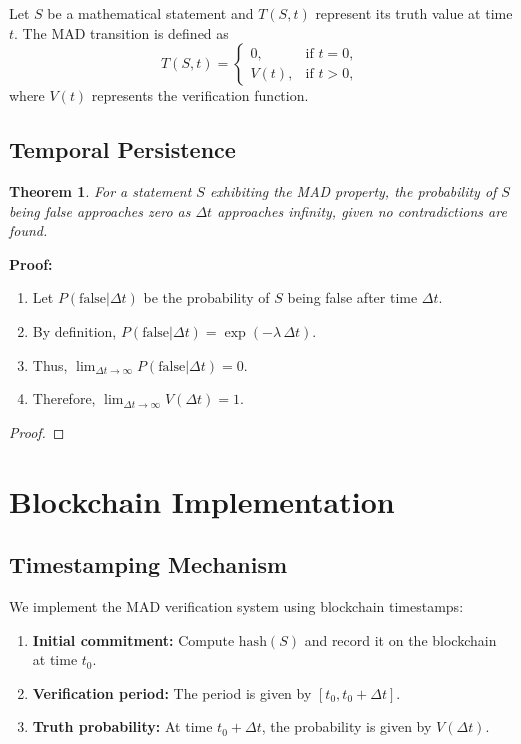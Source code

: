 \documentclass[11pt]{article}
\newtheorem{theorem}{Theorem}[section]
\begin{document}
Let $S$ be a mathematical statement and $T(S,t)$ represent its truth value at time $t$. The MAD transition is defined as
\[
T(S,t) = \begin{cases}
0, & \text{if } t = 0, \\
V(t), & \text{if } t > 0,
\end{cases}
\]
where $V(t)$ represents the verification function.

\subsection{Temporal Persistence}

\begin{theorem}
For a statement $S$ exhibiting the MAD property, the probability of $S$ being false approaches zero as $\Delta t$ approaches infinity, given no contradictions are found.
\end{theorem}

\noindent\textbf{Proof:} 
\begin{enumerate}[label=(\roman*)]
    \item Let $P(\text{false}|\Delta t)$ be the probability of $S$ being false after time $\Delta t$.
    \item By definition, $P(\text{false}|\Delta t)=\exp(-\lambda\,\Delta t)$.
    \item Thus, $\displaystyle \lim_{\Delta t \to \infty}P(\text{false}|\Delta t) = 0$.
    \item Therefore, $\displaystyle \lim_{\Delta t \to \infty} V(\Delta t) = 1$.
\end{enumerate}
\begin{proof}
\end{proof}

\section{Blockchain Implementation}

\subsection{Timestamping Mechanism}

We implement the MAD verification system using blockchain timestamps:
\begin{enumerate}[label=(\arabic*)]
    \item \textbf{Initial commitment:} Compute $\mathrm{hash}(S)$ and record it on the blockchain at time $t_0$.
    \item \textbf{Verification period:} The period is given by $[t_0, t_0+\Delta t]$.
    \item \textbf{Truth probability:} At time $t_0+\Delta t$, the probability is given by $V(\Delta t)$.
\end{enumerate}
\end{document}
